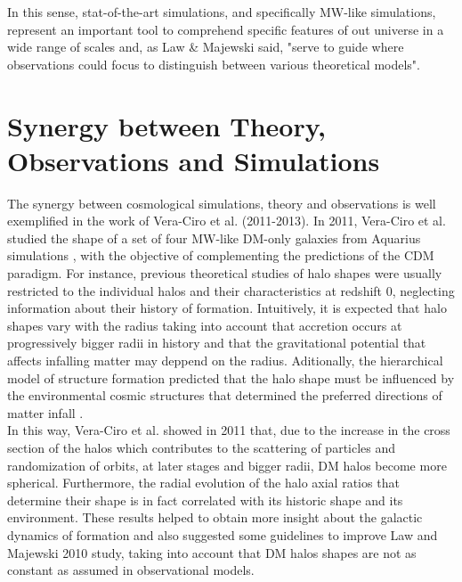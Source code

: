 In this sense, stat-of-the-art simulations, and specifically MW-like simulations, represent an important tool to comprehend specific features of out universe in a wide range of scales and, as Law \& Majewski said, "serve to guide where observations could focus to distinguish between various theoretical models".
 
 


\section{Synergy between Theory, Observations and Simulations }

The synergy between cosmological simulations, theory and observations is well exemplified in the work of Vera-Ciro et al. (2011-2013). In 2011, Vera-Ciro et al. studied the shape of a set of four MW-like DM-only galaxies from Aquarius simulations \cite{aquarius}, with the objective of complementing the predictions of the CDM paradigm. 
For instance, previous theoretical studies of halo shapes were usually restricted to the individual halos and their characteristics at redshift 0, neglecting information about their history of formation.
Intuitively, it is expected that halo shapes vary with the radius taking into account that accretion occurs at progressively bigger radii in history and that the gravitational potential that affects infalling matter may deppend on the radius.
Aditionally, the hierarchical model of structure formation predicted that the halo shape must be influenced by the environmental cosmic structures that determined the preferred directions of matter infall \cite{Tormen_et_al._1997,Colberg_et_al._1999}.\\

In this way, Vera-Ciro et al. showed in 2011 that, due to the increase in the cross section of the halos which contributes to the scattering of particles and randomization of orbits, at later stages and bigger radii, DM halos become more spherical.
Furthermore, the radial evolution of the halo axial ratios that determine their shape is in fact correlated with its historic shape and its environment. 
These results helped to obtain more insight about the galactic dynamics of formation and also suggested some guidelines to improve Law and Majewski 2010 study, taking into account that DM halos shapes are not as constant as assumed in observational models.\\

